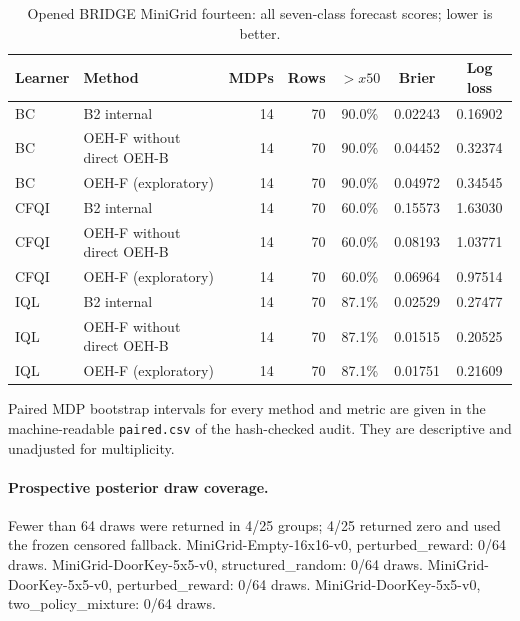 \begin{table}[t]
\centering\small
\caption{Opened BRIDGE MiniGrid fourteen: all seven-class forecast scores; lower is better.}
\begin{tabular}{llrrccc}
\toprule
Learner & Method & MDPs & Rows & $>x50$ & Brier & Log loss\\
\midrule
BC & B2 internal & 14 & 70 & 90.0\% & 0.02243 & 0.16902\\
BC & OEH-F without direct OEH-B & 14 & 70 & 90.0\% & 0.04452 & 0.32374\\
BC & OEH-F (exploratory) & 14 & 70 & 90.0\% & 0.04972 & 0.34545\\
CFQI & B2 internal & 14 & 70 & 60.0\% & 0.15573 & 1.63030\\
CFQI & OEH-F without direct OEH-B & 14 & 70 & 60.0\% & 0.08193 & 1.03771\\
CFQI & OEH-F (exploratory) & 14 & 70 & 60.0\% & 0.06964 & 0.97514\\
IQL & B2 internal & 14 & 70 & 87.1\% & 0.02529 & 0.27477\\
IQL & OEH-F without direct OEH-B & 14 & 70 & 87.1\% & 0.01515 & 0.20525\\
IQL & OEH-F (exploratory) & 14 & 70 & 87.1\% & 0.01751 & 0.21609\\
\bottomrule
\end{tabular}
\end{table}
Paired MDP bootstrap intervals for every method and metric are given in the machine-readable \texttt{paired.csv} of the hash-checked audit. They are descriptive and unadjusted for multiplicity.
\paragraph{Prospective posterior draw coverage.}
Fewer than 64 draws were returned in 4/25 groups; 4/25 returned zero and used the frozen censored fallback.
MiniGrid-Empty-16x16-v0, perturbed\_reward: 0/64 draws. 
MiniGrid-DoorKey-5x5-v0, structured\_random: 0/64 draws. 
MiniGrid-DoorKey-5x5-v0, perturbed\_reward: 0/64 draws. 
MiniGrid-DoorKey-5x5-v0, two\_policy\_mixture: 0/64 draws. 
